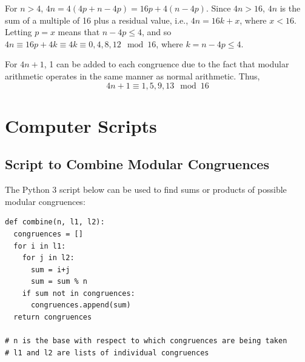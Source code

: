 \documentclass[11pt]{article}
\begin{document}
\begin{appendices}
For $n>4$, $4n=4(4p+n-4p)=16p+4(n-4p)$. Since $4n>16$, $4n$ is the sum of a multiple of 16 plus a residual value, i.e., $4n=16k+x$, where $x<16$. Letting $p=x$ means that $n-4p\leq{4}$, and so $4n\equiv{16p+4k}\equiv{4k}\equiv{0,4,8,12}\mod{16}$, where $k=n-4p\leq{4}$.

For $4n+1$, 1 can be added to each congruence due to the fact that modular arithmetic operates in the same manner as normal arithmetic. Thus,
$$4n+1\equiv{1,5,9,13}\mod{16}$$

\section{Computer Scripts}

\subsection{Script to Combine Modular Congruences}
The Python 3 script below can be used to find sums or products of possible modular congruences:

\begin{verbatim}
def combine(n, l1, l2):
  congruences = []
  for i in l1:
    for j in l2:
      sum = i+j
      sum = sum % n
    if sum not in congruences:
      congruences.append(sum)
  return congruences

# n is the base with respect to which congruences are being taken
# l1 and l2 are lists of individual congruences
\end{verbatim}

\end{appendices}
\end{document}
